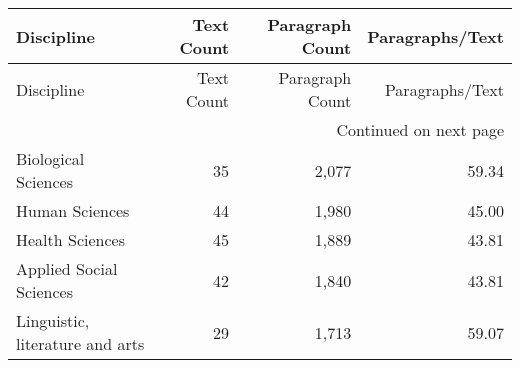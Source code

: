 \begin{longtable}{lrrr}
\toprule
Discipline & Text Count & Paragraph Count & Paragraphs/Text \\
\midrule
\endfirsthead
\toprule
Discipline & Text Count & Paragraph Count & Paragraphs/Text \\
\midrule
\endhead
\midrule
\multicolumn{4}{r}{Continued on next page} \\
\midrule
\endfoot
\bottomrule
\endlastfoot
Biological Sciences & 35 & 2,077 & 59.34 \\
Human Sciences & 44 & 1,980 & 45.00 \\
Health Sciences & 45 & 1,889 & 43.81 \\
Applied Social Sciences & 42 & 1,840 & 43.81 \\
Linguistic, literature and arts & 29 & 1,713 & 59.07 \\
\end{longtable}
